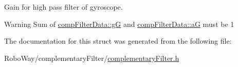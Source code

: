 \-Gain for high pass filter of gyroscope. 

\begin{DoxyWarning}{\-Warning}
\-Sum of \hyperlink{structcomp_filter_data_a15c4d386f5a6e782dccc9b419633bc82}{comp\-Filter\-Data\-::g\-G} and \hyperlink{structcomp_filter_data_afa9cf053cc3f14e6f45db1326dd4faa1}{comp\-Filter\-Data\-::a\-G} must be 1 
\end{DoxyWarning}


\-The documentation for this struct was generated from the following file\-:\begin{DoxyCompactItemize}
\item 
\-Robo\-Way/complementary\-Filter/\hyperlink{complementary_filter_8h}{complementary\-Filter.\-h}\end{DoxyCompactItemize}
